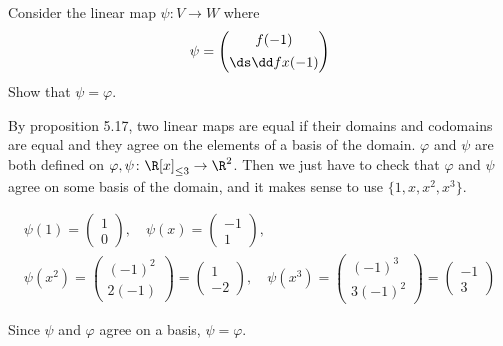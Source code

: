 \documentclass[a4paper]{article}
\begin{document}
\subsection{~} %

\begin{questionbody}
Consider the linear map $\psi \colon V \to W$ where \[
\psi = \begin{pmatrix} f(-1) \\[1ex] \ds \dd fx (-1) \end{pmatrix}
\] Show that $\psi = \varphi$.
\end{questionbody}

By proposition 5.17, two linear maps are equal if their domains and codomains are equal and they agree on the elements of a basis of the domain. $\varphi$ and $\psi$ are both defined on $\varphi, \psi \colon {\R[x]}_{\le 3} \to \R^2$. Then we just have to check that $\varphi$ and $\psi$ agree on some basis of the domain, and it makes sense to use $\{ 1, x, x^2, x^3 \}$.

\begin{gather*}
\psi(1) = \begin{pmatrix}1 \\ 0\end{pmatrix}, \quad
\psi(x) = \begin{pmatrix}-1 \\ 1\end{pmatrix}, \quad \\[1ex]
\psi(x^2) = \begin{pmatrix}{(-1)}^2 \\ 2(-1)\end{pmatrix} = \begin{pmatrix}1 \\ -2\end{pmatrix}, \quad
\psi(x^3) = \begin{pmatrix}{(-1)}^3 \\ 3{(-1)}^2\end{pmatrix} = \begin{pmatrix}-1 \\ 3\end{pmatrix}
\end{gather*}

Since $\psi$ and $\varphi$ agree on a basis, $\psi = \varphi$.

\subsection{~} %
\end{document}
